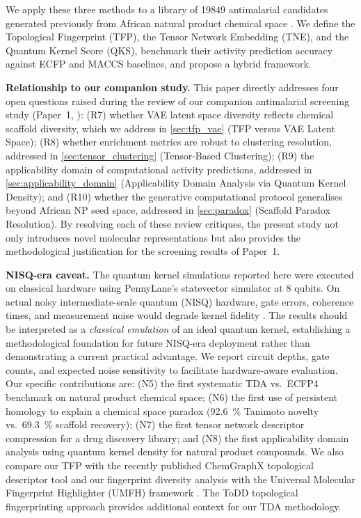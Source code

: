 \documentclass[11pt,a4paper]{article}
\begin{document}
We apply these three methods to a library of \num{19849} antimalarial candidates generated previously from African natural product chemical space \citep{temgoua2026antimalarial}. We define the Topological Fingerprint (TFP), the Tensor Network Embedding (TNE), and the Quantum Kernel Score (QKS), benchmark their activity prediction accuracy against ECFP and MACCS baselines, and propose a hybrid framework.

\noindent\textbf{Relationship to our companion study.} This paper directly addresses four open questions raised during the review of our companion antimalarial screening study (Paper~1, \cite{temgoua2026antimalarial}): (R7) whether VAE latent space diversity reflects chemical scaffold diversity, which we address in \cref{sec:tfp_vae} (TFP versus VAE Latent Space); (R8) whether enrichment metrics are robust to clustering resolution, addressed in \cref{sec:tensor_clustering} (Tensor-Based Clustering); (R9) the applicability domain of computational activity predictions, addressed in \cref{sec:applicability_domain} (Applicability Domain Analysis via Quantum Kernel Density); and (R10) whether the generative computational protocol generalises beyond African NP seed space, addressed in \cref{sec:paradox} (Scaffold Paradox Resolution). By resolving each of these review critiques, the present study not only introduces novel molecular representations but also provides the methodological justification for the screening results of Paper~1.

\noindent\textbf{NISQ-era caveat.} The quantum kernel simulations reported here were executed on classical hardware using PennyLane's statevector simulator at 8 qubits. On actual noisy intermediate-scale quantum (NISQ) hardware, gate errors, coherence times, and measurement noise would degrade kernel fidelity \citep{nature_review_nisq_2024}. The results should be interpreted as a \emph{classical emulation} of an ideal quantum kernel, establishing a methodological foundation for future NISQ-era deployment rather than demonstrating a current practical advantage. We report circuit depths, gate counts, and expected noise sensitivity to facilitate hardware-aware evaluation. Our specific contributions are: (N5) the first systematic TDA vs.\ ECFP4 benchmark on natural product chemical space; (N6) the first use of persistent homology to explain a chemical space paradox (\qty{92.6}{\percent} Tanimoto novelty vs.\ \qty{69.3}{\percent} scaffold recovery); (N7) the first tensor network descriptor compression for a drug discovery library; and (N8) the first applicability domain analysis using quantum kernel density for natural product compounds. We also compare our TFP with the recently published ChemGraphX topological descriptor tool \citep{chemgraphx_2026} and our fingerprint diversity analysis with the Universal Molecular Fingerprint Highlighter (UMFH) framework \citep{umfh_2026}. The ToDD topological fingerprinting approach \citep{todd_2023} provides additional context for our TDA methodology.
\end{document}
